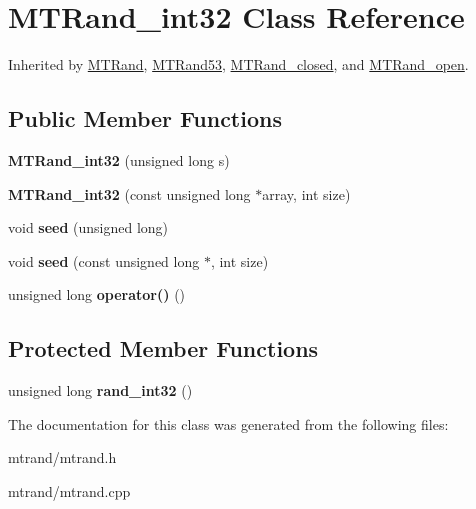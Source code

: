 \hypertarget{class_m_t_rand__int32}{
\section{\-M\-T\-Rand\-\_\-int32 \-Class \-Reference}
\label{class_m_t_rand__int32}
}


\-Inherited by \hyperlink{class_m_t_rand}{\-M\-T\-Rand}, \hyperlink{class_m_t_rand53}{\-M\-T\-Rand53}, \hyperlink{class_m_t_rand__closed}{\-M\-T\-Rand\-\_\-closed}, and \hyperlink{class_m_t_rand__open}{\-M\-T\-Rand\-\_\-open}.

\subsection*{\-Public \-Member \-Functions}
\begin{DoxyCompactItemize}
\item 
\hypertarget{class_m_t_rand__int32_ad30f7c63a6f1fb3c3b76b8ce6ffa0206}{
{\bfseries \-M\-T\-Rand\-\_\-int32} (unsigned long s)}
\label{class_m_t_rand__int32_ad30f7c63a6f1fb3c3b76b8ce6ffa0206}

\item 
\hypertarget{class_m_t_rand__int32_a19acddb3910a7282517b2ffc398b92b4}{
{\bfseries \-M\-T\-Rand\-\_\-int32} (const unsigned long $\ast$array, int size)}
\label{class_m_t_rand__int32_a19acddb3910a7282517b2ffc398b92b4}

\item 
\hypertarget{class_m_t_rand__int32_a0c57076fe30358e0700a7ce1baa0ea27}{
void {\bfseries seed} (unsigned long)}
\label{class_m_t_rand__int32_a0c57076fe30358e0700a7ce1baa0ea27}

\item 
\hypertarget{class_m_t_rand__int32_a3cabc1e3445716236a570ffd2f69686d}{
void {\bfseries seed} (const unsigned long $\ast$, int size)}
\label{class_m_t_rand__int32_a3cabc1e3445716236a570ffd2f69686d}

\item 
\hypertarget{class_m_t_rand__int32_ad7fe22190d0411c6dac8e6f471633aa4}{
unsigned long {\bfseries operator()} ()}
\label{class_m_t_rand__int32_ad7fe22190d0411c6dac8e6f471633aa4}

\end{DoxyCompactItemize}
\subsection*{\-Protected \-Member \-Functions}
\begin{DoxyCompactItemize}
\item 
\hypertarget{class_m_t_rand__int32_abacdfa346255baeac69d29bb57f29b22}{
unsigned long {\bfseries rand\-\_\-int32} ()}
\label{class_m_t_rand__int32_abacdfa346255baeac69d29bb57f29b22}

\end{DoxyCompactItemize}


\-The documentation for this class was generated from the following files\-:\begin{DoxyCompactItemize}
\item 
mtrand/mtrand.\-h\item 
mtrand/mtrand.\-cpp\end{DoxyCompactItemize}
